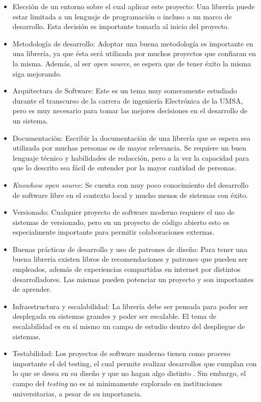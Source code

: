 \begin{itemize}

	\item Elección de un entorno sobre el cual aplicar este proyecto: Una
	      librería puede estar limitada a un lenguaje de programación o incluso a
	      un marco de desarrollo. Esta decisión es importante tomarla al inicio
	      del proyecto.

	\item Metodología de desarrollo: Adoptar una buena metodología es importante
	      en una librería, ya que ésta será utilizada por muchos proyectos que
	      confiaran en la misma. Además, al ser \textit{open source}, se espera que de
	      tener éxito la misma siga mejorando.

	\item Arquitectura de Software: Este es un tema muy someramente estudiado
	      durante el transcurso de la carrera de ingeniería Electrónica de la
	      UMSA, pero es muy necesario para tomar las mejores decisiones en el
	      desarrollo de un sistema.

	\item Documentación: Escribir la documentación de una librería que se espera
	      sea utilizada por muchas personas es de mayor relevancia. Se requiere un
	      buen lenguaje técnico y habilidades de redacción, pero a la vez la
	      capacidad para que lo descrito sea fácil de entender por la mayor
	      cantidad de personas.

	\item \textit{Knowhow open source}: Se cuenta con muy poco conocimiento del
	      desarrollo de software libre en el contexto local y mucho menos de
	      sistemas con éxito.

	\item Versionado: Cualquier proyecto de software moderno requiere el uso de
	      sistemas de versionado, pero en un proyecto de código abierto esto es
	      especialmente importante para permitir colaboraciones externas.

	\item Buenas prácticas de desarrollo y uso de patrones de diseño: Para tener
	      una buena librería existen libros de recomendaciones y patrones que
	      pueden ser empleados, además de experiencias compartidas en internet por
	      distintos desarrolladores.  Las mismas pueden potenciar un proyecto y
	      son importantes de aprender.

	\item Infraestructura y escalabilidad: La librería debe ser pensada para
	      poder ser desplegada en sistemas grandes y poder ser escalable. El tema
	      de escalabilidad es en sí mismo un campo de estudio dentro del
	      despliegue de sistemas.

	\item Testabilidad: Los proyectos de software moderno tienen como proceso
	      importante el del testing, el cual permite realizar desarrollos que cumplan con
	      lo que se desea en su diseño y que no hagan algo distinto \parencite{myersArtSoftwareTesting2012}.
	      Sin embargo, el campo del \textit{testing} no es ni minimamente explorado en
	      instituciones universitarias, a pesar de su importancia.
\end{itemize}